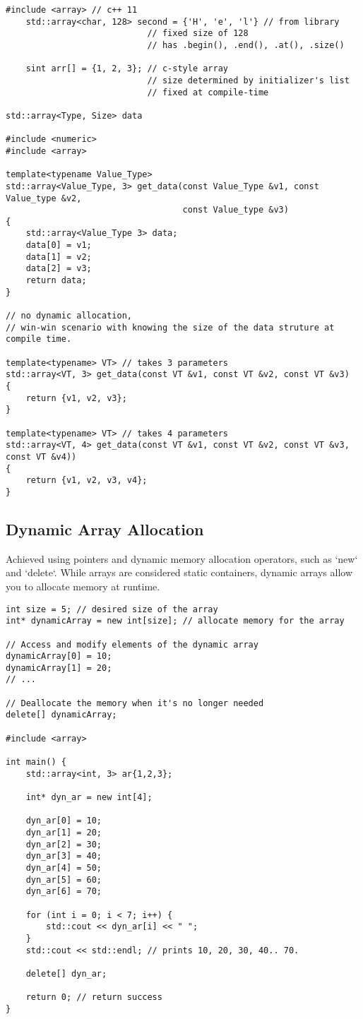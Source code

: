 \documentclass[openany]{report}
\begin{document}
\begin{verbatim}
#include <array> // c++ 11
    std::array<char, 128> second = {'H', 'e', 'l'} // from library
                            // fixed size of 128
                            // has .begin(), .end(), .at(), .size() 

    sint arr[] = {1, 2, 3}; // c-style array 
                            // size determined by initializer's list
                            // fixed at compile-time 

std::array<Type, Size> data

#include <numeric>
#include <array>

template<typename Value_Type>
std::array<Value_Type, 3> get_data(const Value_Type &v1, const Value_type &v2,
                                   const Value_type &v3)
{
    std::array<Value_Type 3> data;
    data[0] = v1;
    data[1] = v2;
    data[2] = v3;
    return data;
}

// no dynamic allocation, 
// win-win scenario with knowing the size of the data struture at compile time.

template<typename> VT> // takes 3 parameters
std::array<VT, 3> get_data(const VT &v1, const VT &v2, const VT &v3)
{
    return {v1, v2, v3};
}

template<typename> VT> // takes 4 parameters
std::array<VT, 4> get_data(const VT &v1, const VT &v2, const VT &v3, const VT &v4))
{
    return {v1, v2, v3, v4};
}
\end{verbatim}

\subsection{Dynamic Array Allocation}

Achieved using pointers and dynamic memory allocation operators, such as `new` and `delete`. 
While arrays are considered static containers,
dynamic arrays allow you to allocate memory at runtime.

\begin{verbatim}
int size = 5; // desired size of the array
int* dynamicArray = new int[size]; // allocate memory for the array

// Access and modify elements of the dynamic array
dynamicArray[0] = 10;
dynamicArray[1] = 20;
// ...

// Deallocate the memory when it's no longer needed
delete[] dynamicArray;

#include <array>

int main() {
    std::array<int, 3> ar{1,2,3};

    int* dyn_ar = new int[4];

    dyn_ar[0] = 10;
    dyn_ar[1] = 20;
    dyn_ar[2] = 30;
    dyn_ar[3] = 40;
    dyn_ar[4] = 50;
    dyn_ar[5] = 60;
    dyn_ar[6] = 70;

    for (int i = 0; i < 7; i++) {
        std::cout << dyn_ar[i] << " ";
    }
    std::cout << std::endl; // prints 10, 20, 30, 40.. 70.

    delete[] dyn_ar;

    return 0; // return success
}

\end{verbatim}
\end{document}
